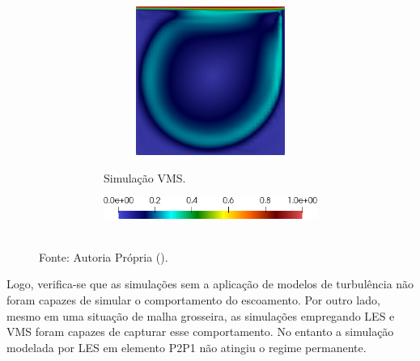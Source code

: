 \begin{figure}[h!]
\begin{subfigure}{\textwidth}
\begin{subfigure}{\textwidth}
\begin{subfigure}{.32\textwidth}
            \end{subfigure}
            \begin{subfigure}{.32\textwidth}
                \includegraphics[width=\linewidth]{Figuras/cavity-poor/VMS-TH.png}
            \end{subfigure}
            \caption{Simulação VMS.}
        \end{subfigure}
        \begin{subfigure}{.5\textwidth}\centering
            \includegraphics[width=\linewidth]{Figuras/cavity-poor/legenda.png}
        \end{subfigure}
    \end{subfigure}
    \label{fig:cavity-coarse}
    \\Fonte: Autoria Própria (\the\year).
\end{figure}

Logo, verifica-se que as simulações sem a aplicação de modelos de turbulência não foram capazes de simular o comportamento do escoamento. Por outro lado, mesmo em uma situação de malha grosseira, as simulações empregando LES e VMS foram capazes de capturar esse comportamento. No entanto a simulação modelada por LES em elemento P2P1 não atingiu o regime permanente.